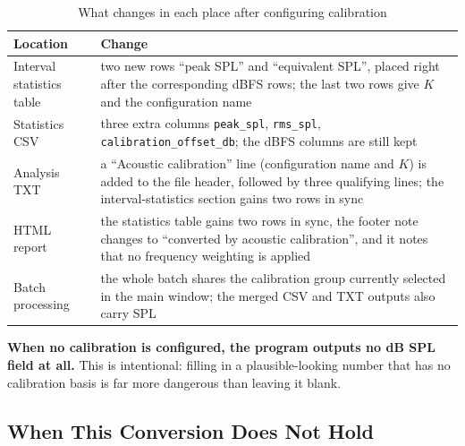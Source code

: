 \documentclass[UTF8,a4paper,12pt]{ctexart}
\begin{document}
\begin{table}[htbp]
\centering
\caption{What changes in each place after configuring calibration}
{\small
\begin{tabular}{@{}>{\raggedright\arraybackslash}p{3.4cm}>{\raggedright\arraybackslash}p{10.4cm}@{}}
\toprule
Location & Change \\
\midrule
Interval statistics table & two new rows ``peak SPL'' and ``equivalent SPL'', placed right after the corresponding dBFS rows; the last two rows give $K$ and the configuration name \\
Statistics CSV & three extra columns \texttt{peak\_spl}, \texttt{rms\_spl}, \texttt{calibration\_offset\_db}; the dBFS columns are still kept \\
Analysis TXT & a ``Acoustic calibration'' line (configuration name and $K$) is added to the file header, followed by three qualifying lines; the interval-statistics section gains two rows in sync \\
HTML report & the statistics table gains two rows in sync, the footer note changes to ``converted by acoustic calibration'', and it notes that no frequency weighting is applied \\
Batch processing & the whole batch shares the calibration group currently selected in the main window; the merged CSV and TXT outputs also carry SPL \\
\bottomrule
\end{tabular}}
\label{tab:calib_outputs}
\end{table}

\textbf{When no calibration is configured, the program outputs no dB SPL field at all.} This is intentional: filling in a plausible-looking number that has no calibration basis is far more dangerous than leaving it blank.

\subsection{When This Conversion Does Not Hold}
\end{document}
